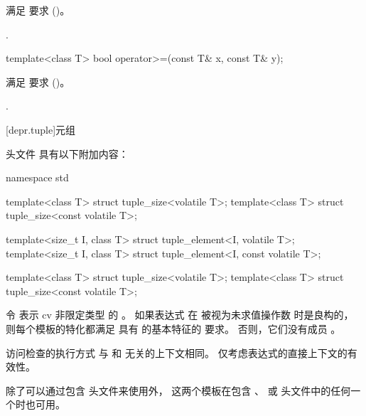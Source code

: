 \begin{itemdescr}
\pnum
\expects
{} 满足  要求 ()。

\pnum
\returns
{}.
\end{itemdescr}

%
\begin{itemdecl}
template<class T> bool operator>=(const T& x, const T& y);
\end{itemdecl}

\begin{itemdescr}
\pnum
\expects
{} 满足  要求 ()。

\pnum
\returns
{}.
\end{itemdescr}

[depr.tuple]{元组}

\pnum
头文件  具有以下附加内容：

\begin{codeblock}
namespace std {
  template<class T> struct tuple_size<volatile T>;
  template<class T> struct tuple_size<const volatile T>;

  template<size_t I, class T> struct tuple_element<I, volatile T>;
  template<size_t I, class T> struct tuple_element<I, const volatile T>;
}
\end{codeblock}

\begin{itemdecl}
template<class T> struct tuple_size<volatile T>;
template<class T> struct tuple_size<const volatile T>;
\end{itemdecl}

\begin{itemdescr}
\pnum
令  表示 cv 非限定类型  的 。
如果表达式  在
被视为未求值操作数 时是良构的，
则每个模板的特化都满足
具有  的基本特征的  要求。
否则，它们没有成员 。

\pnum
访问检查的执行方式
与  和  无关的上下文相同。
仅考虑表达式的直接上下文的有效性。

\pnum
除了可以通过包含  头文件来使用外，
这两个模板在包含
、
 或
头文件中的任何一个时也可用。
\end{itemdescr}

